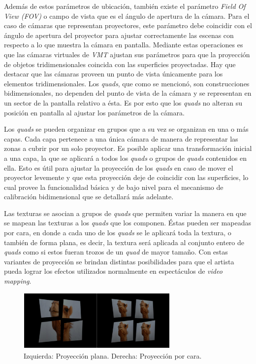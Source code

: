 Además de estos parámetros de ubicación, también existe el parámetro \emph{Field Of View (FOV)} o campo de vista que es el ángulo de apertura de la cámara. Para el caso de cámaras que representan proyectores, este parámetro debe coincidir con el ángulo de apertura del proyector para ajustar correctamente las escenas con respecto a lo que muestra la cámara en pantalla.
Mediante estas operaciones es que las cámaras virtuales de \emph{VMT} ajustan sus parámetros para que la proyección de objetos tridimensionales coincida con las superficies proyectadas.
Hay que destacar que las cámaras proveen un punto de vista únicamente para los elementos tridimensionales. Los \emph{quads}, que como se mencionó, son construcciones bidimensionales, no dependen del punto de vista de la cámara y se representan en un sector de la pantalla relativo a ésta. Es por esto que los \emph{quads} no alteran su posición en pantalla al ajustar los parámetros de la cámara.

Los \emph{quads} se pueden organizar en grupos que a su vez se organizan en una o más capas. Cada capa pertenece a una única cámara de manera de representar las zonas a cubrir por un solo proyector. Es posible aplicar una transformación inicial a una capa, la que se aplicará a todos los \emph{quads} o grupos de \emph{quads} contenidos en ella. Esto es útil para ajustar la proyección de los \emph{quads} en caso de mover el proyector levemente y que esta proyección deje de coincidir con las superficies, lo cual provee la funcionalidad básica y de bajo nivel para el mecanismo de calibración bidimensional que se detallará más adelante.

Las texturas se asocian a grupos de \emph{quads} que permiten variar la manera en que se mapean las texturas a los \emph{quads} que los componen. Éstas pueden ser mapeadas por cara, en donde a cada uno de los \emph{quads} se le aplicará toda la textura, o también de forma plana, es decir, la textura será aplicada al conjunto entero de \emph{quads} como si estos fueran trozos de un \emph{quad} de mayor tamaño.
Con estas variantes de proyección se brindan distintas posibilidades para que el artista pueda lograr los efectos utilizados normalmente en espectáculos de \emph{video mapping}.

\begin{figure}[H]
  \centering
    \includegraphics[width=0.7\textwidth]{./Cap5_vmt/vmtengine-maping.png}
  \caption[Imagen propia.]{Izquierda: Proyección plana. Derecha: Proyección por cara.}%
  \label{fig:VMT-Projection}
\end{figure}

